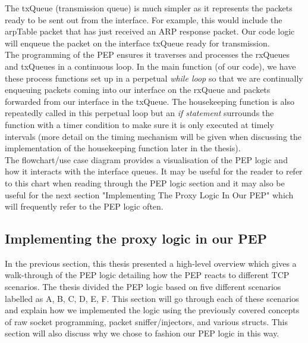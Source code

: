The txQueue (transmission queue) is much simpler as it represents the packets ready to be sent out from the interface. For example, this would include the arpTable packet that has just received an ARP response packet. Our code logic will enqueue the packet on the interface txQueue ready for transmission.  \\

The programming of the PEP  ensures it traverses and processes the rxQueues and txQueues in a continuous loop. In the main function (of our code), we have these process functions set up in a perpetual \emph{while loop} so that we are continually enqueuing packets coming into our interface on the rxQueue and packets forwarded from our interface in the txQueue. The housekeeping function is also repeatedly called in this perpetual loop but an \emph{if statement} surrounds the function with a timer condition to make sure it is only executed at timely intervals (more detail on the timing mechanism will be given when discussing the implementation of the housekeeping function later in the thesis).\\

The flowchart/use case diagram provides a visualisation of the PEP logic and how it interacts with the interface queues. It may be useful for the reader to refer to this chart when reading through the PEP logic section and it may also be useful for the next section "Implementing The Proxy Logic In Our PEP" which will frequently refer to the PEP logic often. 

\subsection{Implementing the proxy logic in our PEP}
In the previous section, this thesis presented a high-level overview which gives a walk-through of the PEP logic detailing how the PEP reacts to different TCP scenarios.  The thesis divided the PEP logic based on five different scenarios labelled as A, B, C, D, E, F. This section will go through each of these scenarios and explain how we implemented the logic using the previously covered concepts of raw socket programming, packet sniffer/injectors, and various structs.  This section will also discuss why we chose to fashion our PEP logic in this way.  \\

